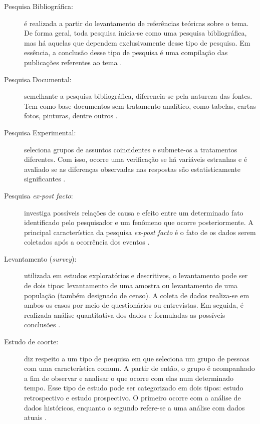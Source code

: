 \begin{description}
\item[Pesquisa Bibliográfica:] é realizada a partir do levantamento de referências teóricas sobre o tema. De forma geral, toda pesquisa inicia-se como uma pesquisa bibliográfica, mas há aquelas que dependem exclusivamente desse tipo de pesquisa. Em essência, a conclusão desse tipo de pesquisa é uma compilação das publicações referentes ao tema \cite{prodanov2013}.  

\item[Pesquisa Documental:] semelhante a pesquisa bibliográfica, diferencia-se pela natureza das fontes. Tem como base documentos sem tratamento analítico, como tabelas, cartas fotos, pinturas, dentre outros \cite{gil2002}. 

\item[Pesquisa Experimental:] seleciona grupos de assuntos coincidentes e submete-os a tratamentos diferentes. Com isso, ocorre uma verificação se há variáveis estranhas e é avaliado se as diferenças observadas nas respostas são estatisticamente significantes \cite{tafner2007}.

\item[Pesquisa \textit{ex-post facto}:] investiga possíveis relações de causa e efeito entre um determinado fato identificado pelo pesquisador e um fenômeno que ocorre posteriormente. A principal característica da pesquisa \textit{ex-post facto} é o fato de os dados serem coletados após a ocorrência dos eventos \cite{gil2002}.

\item[Levantamento (\textit{survey}):] utilizada em estudos exploratórios e descritivos, o levantamento pode ser de dois tipos: levantamento de uma amostra ou levantamento de uma população (também designado de censo). A coleta de dados realiza-se em ambos os casos por meio de questionários ou entrevistas. Em seguida, é realizada análise quantitativa dos dados e formuladas as possíveis conclusões \cite{prodanov2013}.

\item[Estudo de coorte:] diz respeito a um tipo de pesquisa em que seleciona um grupo de pessoas com uma característica comum. A partir de então, o grupo é acompanhado a fim de observar e analisar o que ocorre com elas num determinado tempo. Esse tipo de estudo pode ser categorizado em dois tipos: estudo retrospectivo e estudo prospectivo. O primeiro ocorre com a análise de dados históricos, enquanto o segundo refere-se a uma análise com dados atuais \cite{gil2002}.   


\end{description}
